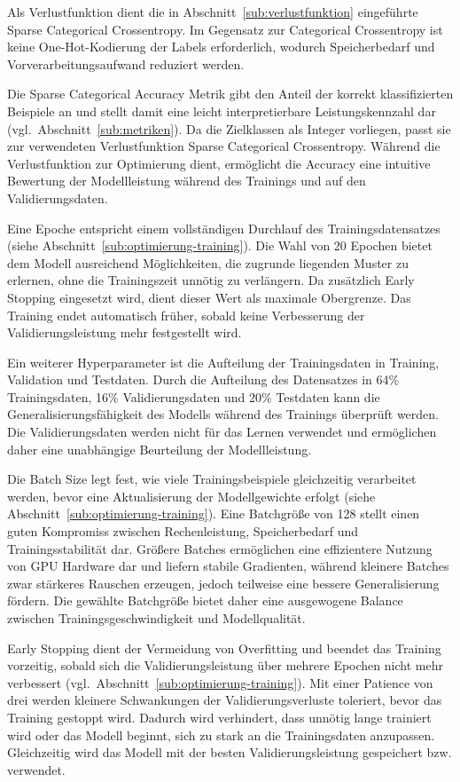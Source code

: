 Als Verlustfunktion dient die in Abschnitt~\ref{sub:verlustfunktion} eingeführte Sparse Categorical Crossentropy. Im Gegensatz zur Categorical Crossentropy ist keine One-Hot-Kodierung der Labels erforderlich, wodurch Speicherbedarf und Vorverarbeitungsaufwand reduziert werden.

Die Sparse Categorical Accuracy Metrik gibt den Anteil der korrekt klassifizierten Beispiele an und stellt damit eine leicht interpretierbare Leistungskennzahl dar (vgl.\ Abschnitt~\ref{sub:metriken}). Da die Zielklassen als Integer vorliegen, passt sie zur verwendeten Verlustfunktion Sparse Categorical Crossentropy. Während die Verlustfunktion zur Optimierung dient, ermöglicht die Accuracy eine intuitive Bewertung der Modellleistung während des Trainings und auf den Validierungsdaten.

Eine Epoche entspricht einem vollständigen Durchlauf des Trainingsdatensatzes (siehe Abschnitt~\ref{sub:optimierung-training}). Die Wahl von 20 Epochen bietet dem Modell ausreichend Möglichkeiten, die zugrunde liegenden Muster zu erlernen, ohne die Trainingszeit unnötig zu verlängern. Da zusätzlich Early Stopping eingesetzt wird, dient dieser Wert als maximale Obergrenze. Das Training endet automatisch früher, sobald keine Verbesserung der Validierungsleistung mehr festgestellt wird.

Ein weiterer Hyperparameter ist die Aufteilung der Trainingsdaten in Training, Validation und Testdaten. Durch die Aufteilung des Datensatzes in 64\% Trainingsdaten, 16\% Validierungsdaten und 20\% Testdaten kann die Generalisierungsfähigkeit des Modells während des Trainings überprüft werden. Die Validierungsdaten werden nicht für das Lernen verwendet und ermöglichen daher eine unabhängige Beurteilung der Modellleistung.

Die Batch Size legt fest, wie viele Trainingsbeispiele gleichzeitig verarbeitet werden, bevor eine Aktualisierung der Modellgewichte erfolgt (siehe Abschnitt~\ref{sub:optimierung-training}). Eine Batchgröße von 128 stellt einen guten Kompromiss zwischen Rechenleistung, Speicherbedarf und Trainingsstabilität dar. Größere Batches ermöglichen eine effizientere Nutzung von GPU Hardware dar und liefern stabile Gradienten, während kleinere Batches zwar stärkeres Rauschen erzeugen, jedoch teilweise eine bessere Generalisierung fördern. Die gewählte Batchgröße bietet daher eine ausgewogene Balance zwischen Trainingsgeschwindigkeit und Modellqualität.

Early Stopping dient der Vermeidung von Overfitting und beendet das Training vorzeitig, sobald sich die Validierungsleistung über mehrere Epochen nicht mehr verbessert (vgl.\ Abschnitt~\ref{sub:optimierung-training}). Mit einer Patience von drei werden kleinere Schwankungen der Validierungsverluste toleriert, bevor das Training gestoppt wird. Dadurch wird verhindert, dass unnötig lange trainiert wird oder das Modell beginnt, sich zu stark an die Trainingsdaten anzupassen. Gleichzeitig wird das Modell mit der besten Validierungsleistung gespeichert bzw. verwendet.


